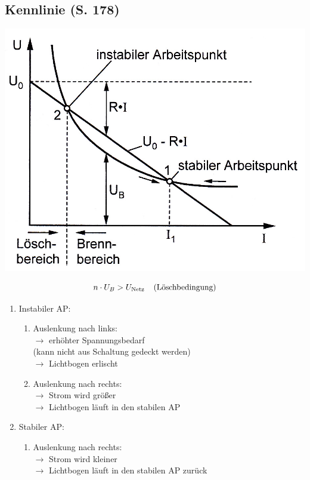 \documentclass[a4paper,twocolumn,10pt]{article}
\begin{document}
\subsection{Kennlinie (S. 178)}
\begin{center}
\includegraphics[width=0.98\columnwidth]{Grafiken/Lichtbogen}
\end{center}
\begin{equation*}
n\cdot U_B>U_{\text{Netz}}\;\;\;\;\text{(Löschbedingung)}\\
\end{equation*}
\begin{enumerate}[label=$\bullet$]
\item Instabiler AP:
\begin{enumerate}[label=-]
\item Auslenkung nach links:\\
$\rightarrow$ erhöhter Spannungsbedarf\\
(kann nicht aus Schaltung gedeckt werden)\\
$\rightarrow$ Lichtbogen erlischt
\item Auslenkung nach rechts:\\
$\rightarrow$ Strom wird größer\\
$\rightarrow$ Lichtbogen läuft in den stabilen AP
\end{enumerate}
\item Stabiler AP:
\begin{enumerate}[label=-]
\item Auslenkung nach rechts:\\
$\rightarrow$ Strom wird kleiner\\
$\rightarrow$ Lichtbogen läuft in den stabilen AP zurück
\end{enumerate}
\end{enumerate}
\end{document}

